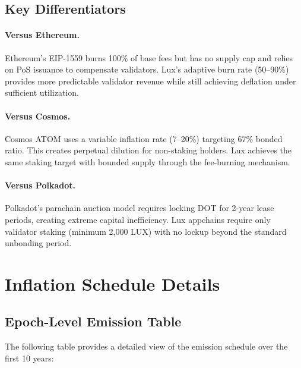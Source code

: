 \documentclass[11pt,a4paper]{article}
\begin{document}
\subsection{Key Differentiators}

\paragraph{Versus Ethereum.} Ethereum's EIP-1559 burns 100\% of base fees but has no supply cap and relies on PoS issuance to compensate validators. Lux's adaptive burn rate (50--90\%) provides more predictable validator revenue while still achieving deflation under sufficient utilization.

\paragraph{Versus Cosmos.} Cosmos ATOM uses a variable inflation rate (7--20\%) targeting 67\% bonded ratio. This creates perpetual dilution for non-staking holders. Lux achieves the same staking target with bounded supply through the fee-burning mechanism.

\paragraph{Versus Polkadot.} Polkadot's parachain auction model requires locking DOT for 2-year lease periods, creating extreme capital inefficiency. Lux appchains require only validator staking (minimum 2,000 LUX) with no lockup beyond the standard unbonding period.

\section{Inflation Schedule Details}\label{sec:inflation}

\subsection{Epoch-Level Emission Table}

The following table provides a detailed view of the emission schedule over the first 10 years:
\end{document}
